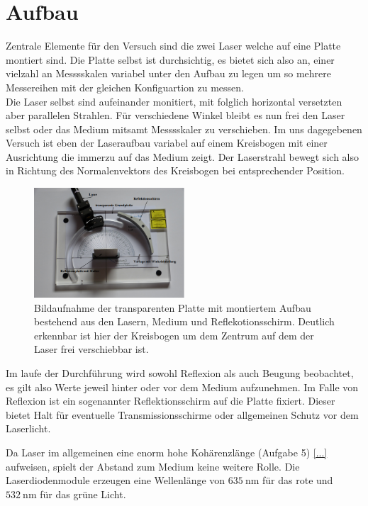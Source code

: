 \newpage
\section{Aufbau}
Zentrale Elemente für den Versuch sind die zwei Laser welche auf eine Platte montiert sind. Die Platte selbst ist durchsichtig,
es bietet sich also an, einer vielzahl an Messsskalen variabel unter den Aufbau zu legen um so mehrere Messereihen mit der gleichen 
Konfiguartion zu messen. \\
Die Laser selbst sind aufeinander monitiert, mit folglich horizontal versetzten aber parallelen Strahlen. Für verschiedene
Winkel bleibt es nun frei den Laser selbst oder das Medium mitsamt Messsskaler zu verschieben. Im uns dagegebenen Versuch 
ist eben der Laseraufbau variabel auf einem Kreisbogen mit einer Ausrichtung die immerzu auf das Medium zeigt. Der Laserstrahl 
bewegt sich also in Richtung des Normalenvektors des Kreisbogen bei entsprechender Position. 
\begin{figure}
    \centering
    \includegraphics[width=0.5\textwidth]{bilder/afbau.png}
    \caption{Bildaufnahme der transparenten Platte mit montiertem Aufbau bestehend aus den Lasern, Medium und Reflekotionsschirm.
    Deutlich erkennbar ist hier der Kreisbogen um dem Zentrum auf dem der Laser frei verschiebbar ist. \cite{skript}} 
    \label{fig:teile}
\end{figure}
\FloatBarrier
\flushleft Im laufe der Durchführung wird sowohl Reflexion als auch Beugung beobachtet, es gilt also Werte jeweil hinter oder vor dem Medium 
aufzunehmen. Im Falle von Reflexion ist ein sogenannter Reflektionsschirm auf die Platte fixiert. Dieser bietet Halt für eventuelle
Transmissionsschirme oder allgemeinen Schutz vor dem Laserlicht.

Da Laser im allgemeinen eine enorm hohe Kohärenzlänge (Aufgabe 5) \ref{...} aufweisen, spielt der Abstand zum Medium keine weitere Rolle. 
Die Laserdiodenmodule erzeugen eine Wellenlänge von $\SI{635}{\nano\meter}$ für das rote und $\SI{532}{\nano\meter}$ für das
grüne Licht.

